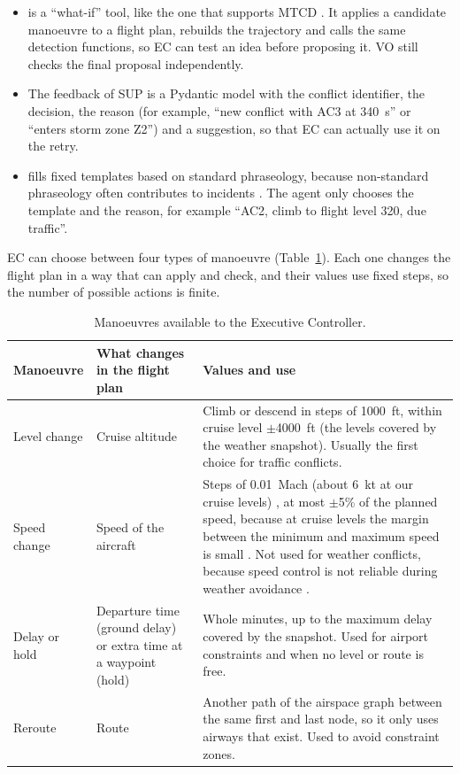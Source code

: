 \begin{itemize}
  \item {} is a ``what-if'' tool, like the one that supports
        MTCD \cite{skybrary_mtcd}. It applies a candidate manoeuvre to a flight plan,
        rebuilds the trajectory and calls the same detection functions, so EC can test an
        idea before proposing it. VO still checks the final proposal independently.
  \item The feedback of SUP is a Pydantic model with the conflict identifier, the decision,
        the reason (for example, ``new conflict with AC3 at 340~s'' or ``enters storm zone
        Z2'') and a suggestion, so that EC can actually use it on the retry.
  \item {} fills fixed templates based on standard phraseology,
        because non-standard phraseology often contributes to incidents
        \cite{skybrary_phraseology}. The agent only chooses the template and the reason, for
        example ``AC2, climb to flight level 320, due traffic''.
\end{itemize}

EC can choose between four types of manoeuvre (Table~\ref{tab:manoeuvres}). Each one changes
the flight plan in a way that  can apply and check, and their
values use fixed steps, so the number of possible actions is finite.

\begin{table}[!htbp]
\centering
\small
\caption{Manoeuvres available to the Executive Controller.}
\label{tab:manoeuvres}
\begin{tabularx}{\textwidth}{@{}>{\raggedright\arraybackslash}p{2.4cm}
                               >{\raggedright\arraybackslash}p{4.6cm} X@{}}
\toprule
\textbf{Manoeuvre} & \textbf{What changes in the flight plan} & \textbf{Values and use} \\
\midrule
Level change
  & Cruise altitude
  & Climb or descend in steps of 1000~ft, within cruise level $\pm$4000~ft (the levels
    covered by the weather snapshot). Usually the first choice for traffic conflicts. \\
\addlinespace
Speed change
  & Speed of the aircraft
  & Steps of 0.01~Mach (about 6~kt at our cruise levels) \cite{skybrary_speed_control},
    at most $\pm$5\% of the planned speed, because at cruise levels the margin between the
    minimum and maximum speed is small \cite{skybrary_cruise_guide}. Not used for weather
    conflicts, because speed control is not reliable during weather avoidance
    \cite{skybrary_wx_los}. \\
\addlinespace
Delay or hold
  & Departure time (ground delay) or extra time at a waypoint (hold)
  & Whole minutes, up to the maximum delay covered by the snapshot. Used for airport
    constraints and when no level or route is free. \\
\addlinespace
Reroute
  & Route
  & Another path of the airspace graph between the same first and last node, so it only
    uses airways that exist. Used to avoid constraint zones. \\
\bottomrule
\end{tabularx}
\end{table}

